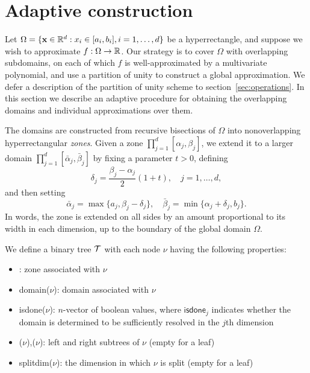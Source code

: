 \section{Adaptive construction}
\label{sec:construction}

Let $\Omega = \{ \mathbf{x} \in \mathbb{R}^d: x_i \in [a_i,b_i], i=1,\ldots,d\}$ be a hyperrectangle, and suppose we wish to approximate $f:\Omega \to \mathbb{R}$. Our strategy is to cover $\Omega$ with overlapping subdomains, on each of which $f$ is well-approximated by a multivariate polynomial, and use a partition of unity to construct a global approximation. We defer a description of the partition of unity scheme to section~\ref{sec:operations}. In this section we describe an adaptive procedure for obtaining the overlapping domains and individual approximations over them. 

The domains are constructed from recursive bisections of $\Omega$ into nonoverlapping hyperrectangular \emph{zones}. Given a zone $\prod_{j=1}^d [\alpha_{j},\beta_{j}]$, we extend it to a larger domain $\prod_{j=1}^d [\bar{\alpha}_{j},\bar{\beta}_{j}]$ by fixing a parameter $t>0$, defining
\begin{equation}
  \label{eq:overlap}
  \delta_{j} =  \frac{\beta_{j}-\alpha_{j}}{2}(1+t),\quad j=1,\ldots,d,
\end{equation}
and then setting
\begin{equation}
  \bar{\alpha}_{j} = \max\{a_j,\beta_{j}-\delta_{j}\}, \quad \bar{\beta}_{j} = \min\{\alpha_{j}+\delta_{j},b_j\}.
  \label{eq:zone_extend}
\end{equation}
In words, the zone is extended on all sides by an amount proportional to its width in each dimension, up to the boundary of the global domain $\Omega$. 


We define a binary tree $\mathcal{T}$ with each node $\nu$ having the following properties:
\begin{itemize}
\item {}: zone associated with $\nu$
\item \textsf{domain}($\nu$): domain associated with $\nu$
\item \textsf{isdone}($\nu$): $n$-vector of boolean values, where $\textsf{isdone}_j$ indicates whether the domain is determined to be sufficiently resolved in the $j$th dimension
\item {}($\nu$),($\nu$): left and right subtrees of $\nu$ (empty for a leaf)
\item \textsf{splitdim}($\nu$): the dimension in which $\nu$ is split (empty for a leaf)
\end{itemize}

